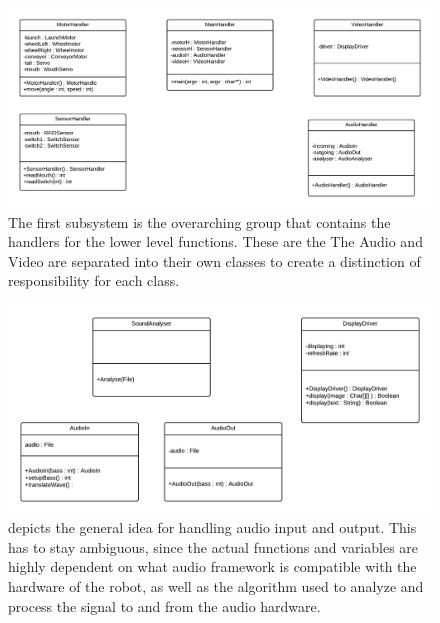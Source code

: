 \documentclass[11pt,twoside,a4paper]{report}
\begin{document}
\begin{figure}[!htb]
\begin{center}
\includegraphics[scale=0.40, angle=90]{Images/VolcanoBot-Controllers.png}
\caption{The first subsystem is the overarching group that contains the handlers for the lower level functions. These are the The Audio and Video are separated into their own classes to create a distinction of responsibility for each class.}
\label{fig:controllers}
\end{center}
\end{figure}
\begin{figure}[!htb]
\begin{center}
\includegraphics[scale=0.40, angle=90]{Images/VolcanoBot-Audio-Video.png}
\caption{depicts the general idea for handling audio input and output. This has to stay ambiguous, since the actual functions and variables are highly dependent on what audio framework is compatible with the hardware of the robot, as well as the algorithm used to analyze and process the signal to and from the audio hardware.}
\label{fig:audiovideo}
\end{center}
\end{figure}
\end{document}
